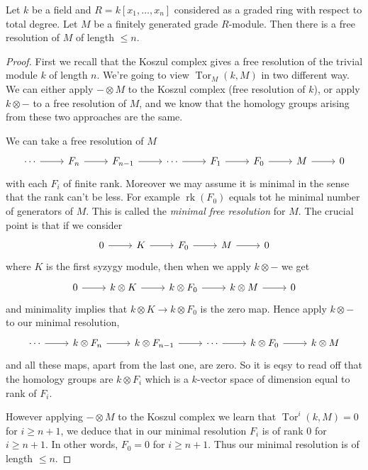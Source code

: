 \documentclass[a4paper]{article}
\DeclareMathOperator{\Tor}{Tor}
\begin{document}
\begin{theorem}
  Let \(k\) be a field and \(R = k[x_1, \dots, x_n]\) considered as a graded ring with respect to total degree. Let \(M\) be a finitely generated grade \(R\)-module. Then there is a free resolution of \(M\) of length \(\leq n\).
\end{theorem}

\begin{proof}
  First we recall that the Koszul complex gives a free resolution of the trivial module \(k\) of length \(n\). We're going to view \(\Tor_M(k, M)\) in two different way. We can either apply \(- \otimes M\) to the Koszul complex (free resolution of \(k\)), or apply \(k \otimes -\) to a free resolution of \(M\), and we know that the homology groups arising from these two approaches are the same.

  We can take a free resolution of \(M\)
  \[
    \begin{tikzcd}
      \cdots \ar[r] & F_n \ar[r] & F_{n - 1} \ar[r] & \cdots \ar[r] & F_1 \ar[r] & F_0 \ar[r] & M \ar[r] & 0
    \end{tikzcd}
  \]
  with each \(F_i\) of finite rank. Moreover we may assume it is minimal in the sense that the rank can't be less. For example \(\operatorname{rk}(F_0)\) equals tot he minimal number of generators of \(M\). This is called the \emph{minimal free resolution} for \(M\). The crucial point is that if we consider
  \[
    \begin{tikzcd}
      0 \ar[r] & K \ar[r] & F_0 \ar[r] & M \ar[r] & 0
    \end{tikzcd}
  \]
  where \(K\) is the first syzygy module, then when we apply \(k \otimes -\) we get
  \[
    \begin{tikzcd}
      0 \ar[r] & k \otimes K \ar[r] & k \otimes F_0 \ar[r] & k \otimes M \ar[r] & 0
    \end{tikzcd}
  \]
  and minimality implies that \(k \otimes K \to k \otimes F_0\) is the zero map. Hence apply \(k \otimes -\) to our minimal resolution,
  \[
    \begin{tikzcd}
      \cdots \ar[r] & k \otimes F_n \ar[r] & k \otimes F_{n - 1} \ar[r] & \cdots \ar[r] & k \otimes F_0 \ar[r] & k \otimes M
    \end{tikzcd}
  \]
  and all these maps, apart from the last one, are zero. So it is eqsy to read off that the homology groups are \(k \otimes F_i\) which is a \(k\)-vector space of dimension equal to rank of \(F_i\).

  However applying \(- \otimes M\) to the Koszul complex we learn that \(\Tor^i(k, M) = 0\) for \(i \geq n + 1\), we deduce that in our minimal resolution \(F_i\) is of rank \(0\) for \(i \geq n + 1\). In other words, \(F_0 = 0\) for \(i \geq n + 1\). Thus our minimal resolution is of length \(\leq n\).
\end{proof}



\printindex
\end{document}

